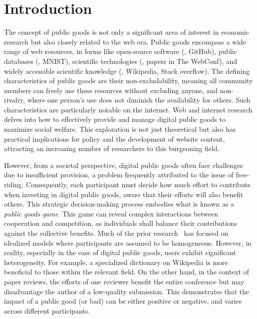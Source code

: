 \section{Introduction}
\label{sec:intro}

The concept of public goods is not only a significant area of interest in economic research but also closely related to the web era.
Public goods encompass a wide range of web resources, in forms like open-source software (\eg, GitHub), public databases (\eg, MNIST), scientific technologies (\eg, papers in The WebConf), and widely accessible scientific knowledge (\eg, Wikipedia, Stack overflow).
The defining characteristics of public goods are their non-excludability, meaning all community members can freely use these resources without excluding anyone, and non-rivalry, where one person’s use does not diminish the availability for others. 
Such characteristics are particularly notable on the internet. 
Web and internet research delves into how to effectively provide and manage digital public goods to maximize social welfare. This exploration is not just theoretical but also has practical implications for policy and the development of website content, attracting an increasing number of researchers to this burgeoning field.


However, from a societal perspective, digital public goods often face challenges due to insufficient provision, a problem frequently attributed to the issue of free-riding. Consequently, each participant must decide how much effort to contribute when investing in digital public goods, aware that their efforts will also benefit others. This strategic decision-making process embodies what is known as a {\it public goods game}. This game can reveal complex interactions between cooperation and competition, as individuals shall balance their contributions against the collective benefits. Much of the prior research~\cite{public-network:bramoulle2007public} has focused on idealized models where participants are assumed to be homogeneous. However, in reality, especially in the case of digital public goods, users exhibit significant heterogeneity. For example, a specialized dictionary on Wikipedia is more beneficial to those within the relevant field. On the other hand, in the context of paper reviews, the efforts of one reviewer benefit the entire conference but may disadvantage the author of a low-quality submission. This demonstrates that the impact of a public good (or bad) can be either positive or negative, and varies across different participants.

